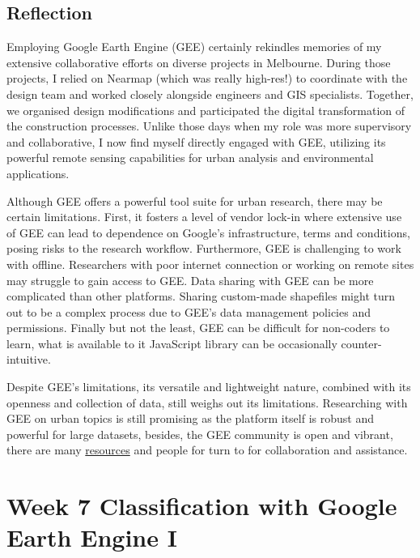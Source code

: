 \documentclass[
  letterpaper,
  DIV=11,
  numbers=noendperiod]{scrreprt}
\begin{document}
\hypertarget{reflection-2}{%
\section*{Reflection}\label{reflection-2}}


Employing Google Earth Engine (GEE) certainly rekindles memories of my
extensive collaborative efforts on diverse projects in Melbourne. During
those projects, I relied on Nearmap (which was really high-res!) to
coordinate with the design team and worked closely alongside engineers
and GIS specialists. Together, we organised design modifications and
participated the digital transformation of the construction processes.
Unlike those days when my role was more supervisory and collaborative, I
now find myself directly engaged with GEE, utilizing its powerful remote
sensing capabilities for urban analysis and environmental applications.

Although GEE offers a powerful tool suite for urban research, there may
be certain limitations. First, it fosters a level of vendor lock-in
where extensive use of GEE can lead to dependence on Google's
infrastructure, terms and conditions, posing risks to the research
workflow. Furthermore, GEE is challenging to work with offline.
Researchers with poor internet connection or working on remote sites may
struggle to gain access to GEE. Data sharing with GEE can be more
complicated than other platforms. Sharing custom-made shapefiles might
turn out to be a complex process due to GEE's data management policies
and permissions. Finally but not the least, GEE can be difficult for
non-coders to learn, what is available to it JavaScript library can be
occasionally counter-intuitive.

Despite GEE's limitations, its versatile and lightweight nature,
combined with its openness and collection of data, still weighs out its
limitations. Researching with GEE on urban topics is still promising as
the platform itself is robust and powerful for large datasets, besides,
the GEE community is open and vibrant, there are many
\protect\hyperlink{remote-sensing-term-recap}{resources} and people for
turn to for collaboration and assistance.

\hypertarget{week-7-classification-with-google-earth-engine-i}{%
\chapter*{Week 7 Classification with Google Earth Engine
I}\label{week-7-classification-with-google-earth-engine-i}}
\end{document}
